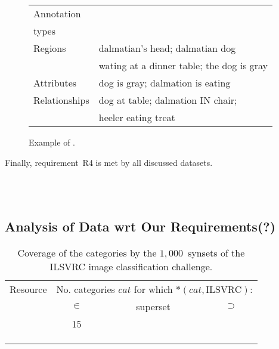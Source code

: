 {\begin{figure}[t]
	\begin{center}
	\begin{minipage}{.33\textwidth}
	\end{minipage}
	\begin{minipage}{.65\textwidth}
		\begin{tabular}{l|l}
			\hline
			Annotation	& \\	
			types		& 	\\
			\hline \hline
			Regions &  dalmatian's head; dalmatian dog\\
					& wating at a dinner table; the dog is gray\\
			Attributes & dog is gray; dalmation is eating\\
			Relationships & dog at table; dalmation IN chair; \\
							& heeler eating treat \\
							\hline
		\end{tabular}
	\end{minipage}
	\caption{Example of \vgenome. \label{fig:ex_visualgenome}}
	\end{center}
\end{figure}


\noindent
Finally, requirement~R4 is met by all discussed datasets. 

\\\\

\subsection{Analysis of Data wrt Our Requirements(?)}

\begin{table}[t]
	\begin{tabular}{lccc}
		\hline
		Resource & \multicolumn{3}{c}{No. categories $cat$ for which $*(cat, \text{ILSVRC})$:} \\
				& $\in$
				& superset
				& $\supset$\\
		\hline \hline
		 & 15 \\
		 & \\
		\flickr & \\
		\vgenome & \\
		\hline
	\end{tabular}
	\caption{Coverage of the categories by the $1,000$~synsets of the ILSVRC image classification challenge.  \label{tab:coverage_ilsvrc}}
\end{table}


}
